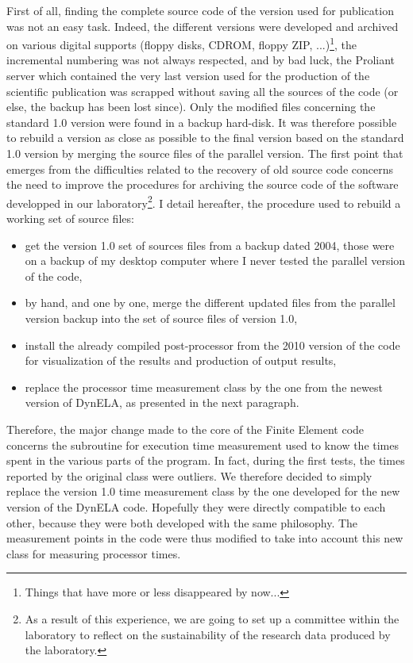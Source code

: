 First of all, finding the complete source code of the version used for publication was not an easy task. Indeed, the different versions were developed and archived on various digital supports (floppy disks, CDROM, floppy ZIP, ...)\footnote{Things that have more or less disappeared by now...}, the incremental numbering was not always respected, and by bad luck, the Proliant server which contained the very last version used for the production of the scientific publication was scrapped without saving all the sources of the code (or else, the backup has been lost since). Only the modified files concerning the standard 1.0 version were found in a backup hard-disk. It was therefore possible to rebuild a version as close as possible to the final version based on the standard 1.0 version by merging the source files of the parallel version. The first point that emerges from the difficulties related to the recovery of old source code concerns the need to improve the procedures for archiving the source code of the software developped in our laboratory\footnote{As a result of this experience, we are going to set up a committee within the laboratory to reflect on the sustainability of the research data produced by the laboratory.}. I detail hereafter, the procedure used to rebuild a working set of source files:
\begin{itemize}
\item get the version 1.0 set of sources files from a backup dated 2004, those were on a backup of my desktop computer where I never tested the parallel version of the code,
\item by hand, and one by one, merge the different updated files from the parallel version backup into the set of source files of version 1.0,
\item install the already compiled post-processor from the 2010 version of the code for visualization of the results and production of output results,
\item replace the processor time measurement class by the one from the newest version of DynELA, as presented in the next paragraph.
\end{itemize}

Therefore, the major change made to the core of the Finite Element code concerns the subroutine for execution time measurement used to know the times spent in the various parts of the program. In fact, during the first tests, the times reported by the original class were outliers. We therefore decided to simply replace the version 1.0 time measurement class by the one developed for the new version of the DynELA code. Hopefully they were directly compatible to each other, because they were both developed with the same philosophy. The measurement points in the code were thus modified to take into account this new class for measuring processor times.

